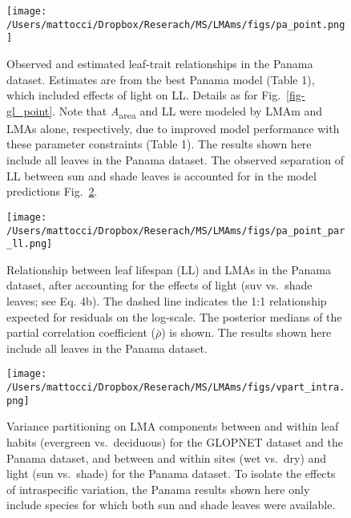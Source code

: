\documentclass[
  12pt,
  letterpaper,
  DIV=11,
  numbers=noendperiod]{scrartcl}
\begin{document}
\newpage

\begin{figure}

{\centering \texttt{[image: /Users/mattocci/Dropbox/Reserach/MS/LMAms/figs/pa\_point.png]}

}

\caption{\label{fig-pa_point}Observed and estimated leaf-trait
relationships in the Panama dataset. Estimates are from the best Panama
model (Table 1), which included effects of light on LL. Details as for
Fig.~\ref{fig-gl_point}. Note that \emph{A}\textsubscript{area} and LL
were modeled by LMAm and LMAs alone, respectively, due to improved model
performance with these parameter constraints (Table 1). The results
shown here include all leaves in the Panama dataset. The observed
separation of LL between sun and shade leaves is accounted for in the
model predictions Fig.~\ref{fig-ll_point}.}

\end{figure}

\newpage

\begin{figure}

{\centering \texttt{[image: /Users/mattocci/Dropbox/Reserach/MS/LMAms/figs/pa\_point\_par\_ll.png]}

}

\caption{\label{fig-ll_point}Relationship between leaf lifespan (LL) and
LMAs in the Panama dataset, after accounting for the effects of light
(suv vs.~shade leaves; see Eq. 4b). The dashed line indicates the 1:1
relationship expected for residuals on the log-scale. The posterior
medians of the partial correlation coefficient (\(\bar{\rho}\)) is
shown. The results shown here include all leaves in the Panama dataset.}

\end{figure}

\newpage

\begin{figure}

{\centering \texttt{[image: /Users/mattocci/Dropbox/Reserach/MS/LMAms/figs/vpart\_intra.png]}

}

\caption{\label{fig-vpart}Variance partitioning on LMA components
between and within leaf habits (evergreen vs.~deciduous) for the GLOPNET
dataset and the Panama dataset, and between and within sites (wet
vs.~dry) and light (sun vs.~shade) for the Panama dataset. To isolate
the effects of intraspecific variation, the Panama results shown here
only include species for which both sun and shade leaves were
available.}

\end{figure}
\end{document}
